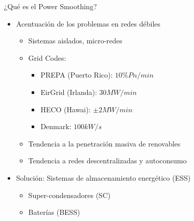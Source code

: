 %
%
\begin{frame}{¿Qué es el Power Smoothing?}
\begin{itemize}
    \item Acentuación de los problemas en redes débiles\\[1ex]
    \begin{itemize}
        \item Sistemas aislados, micro-redes \\[1ex]
        \item Grid Codes:
        \begin{itemize}
            \item PREPA (Puerto Rico): $10\% Pn/min$
            \item EirGrid (Irlanda): $30 MW/min$
            \item HECO (Hawai): $\pm2 MW/min$
            \item Denmark: $100 kW/s$ \\[1ex]
        \end{itemize}
        \item Tendencia a la penetración masiva de renovables \\[1ex]
        \item Tendencia a redes descentralizadas y autoconsumo \\[2ex]
    \end{itemize}{}
    \item Solución: Sistemas de almacenamiento energético (ESS)
    \begin{itemize}
        \item Super-condensadores  (SC)\\[1ex]
        \item Baterías (BESS)\\[1ex]
    \end{itemize}
\end{itemize}
\end{frame}
%
%

